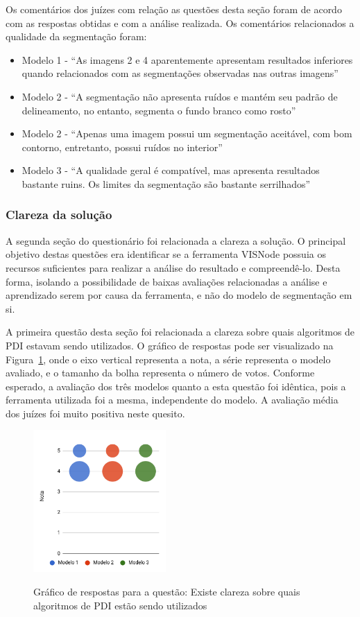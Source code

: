 \documentclass[12pt,oneside,a4paper,english,french,spanish,brazil,]{abntex2}
\begin{document}
Os comentários dos juízes com relação as questões desta seção foram de acordo com as respostas obtidas e com a análise realizada. Os comentários relacionados a qualidade da segmentação foram:
\begin{itemize}
    \item Modelo 1 - ``As imagens 2 e 4 aparentemente apresentam resultados inferiores quando relacionados com as segmentações observadas nas outras imagens''
    \item Modelo 2 - ``A segmentação não apresenta ruídos e mantém seu padrão de delineamento, no entanto, segmenta o fundo branco como rosto''
    \item Modelo 2 - ``Apenas uma imagem possui um segmentação aceitável, com bom contorno, entretanto, possui ruídos no interior''
    \item Modelo 3 - ``A qualidade geral é compatível, mas apresenta resultados bastante ruins. Os limites da segmentação são bastante serrilhados''
\end{itemize}

\subsubsection{Clareza da solução}

A segunda seção do questionário foi relacionada a clareza a solução. O principal objetivo destas questões era identificar se a ferramenta VISNode possuia os recursos suficientes para realizar a análise do resultado e compreendê-lo. Desta forma, isolando a possibilidade de baixas avaliações relacionadas a análise e aprendizado serem por causa da ferramenta, e não do modelo de segmentação em si.

A primeira questão desta seção foi relacionada a clareza sobre quais algoritmos de PDI estavam sendo utilizados. O gráfico de respostas pode ser visualizado na Figura~\ref{fig:AJ_Qualidade_8}, onde o eixo vertical representa a nota, a série representa o modelo avaliado, e o tamanho da bolha representa o número de votos. Conforme esperado, a avaliação dos três modelos quanto a esta questão foi idêntica, pois a ferramenta utilizada foi a mesma, independente do modelo. A avaliação média dos juízes foi muito positiva neste quesito.

\begin{figure}[ht]
\centering
\caption{Gráfico de respostas para a questão: Existe clareza sobre quais algoritmos de PDI estão sendo utilizados}
\includegraphics[width=0.45\textwidth]{imagens/Avaliacao_Juizes/Grafico_8.png}
\sourceAuthor{}
\label{fig:AJ_Qualidade_8}
\end{figure}
\end{document}
